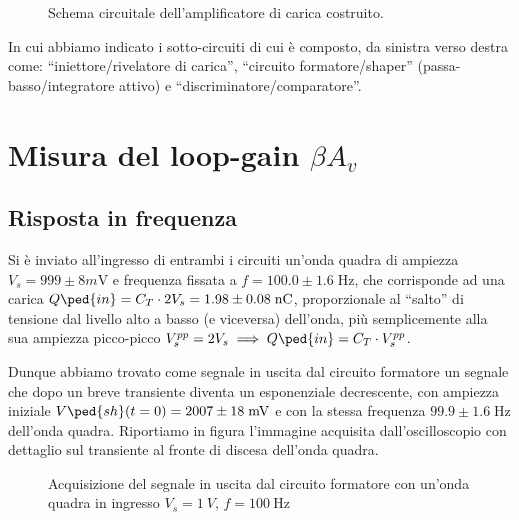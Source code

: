 \documentclass[10pt, a4paper, italian]{article}
\begin{document}
\begin{figure}[htbp]
    \centering
    \caption{Schema circuitale dell'amplificatore di carica costruito.
    \label{fig: Qampschm}}
\end{figure}

In cui abbiamo indicato i sotto-circuiti di cui è composto, da sinistra verso
destra come: ``iniettore/rivelatore di carica'', ``circuito formatore/shaper''
(passa-basso/integratore attivo) e ``discriminatore/comparatore''.

\section{Misura del loop-gain $\beta A_v$}

\subsection{Risposta in frequenza}
Si è inviato all'ingresso di entrambi i circuiti un'onda quadra di
ampiezza $V_s = 999 \pm 8 \si{m\V}$ e frequenza fissata a
$f = 100.0 \pm 1.6 \; \si{\Hz}$, che corrisponde ad una carica
$Q\ped{in} = C_T \cdot 2V_s = 1.98 \pm 0.08 \; \si{n\coulomb}$, proporzionale
al ``salto'' di tensione dal livello alto a basso (e viceversa) dell'onda,
più semplicemente alla sua ampiezza picco-picco
$V_s^{pp} = 2 V_s \implies Q\ped{in} = C_T \cdot V_s^{pp}$.

Dunque abbiamo trovato come segnale in uscita dal circuito formatore un
segnale che dopo un breve transiente diventa un esponenziale decrescente,
con ampiezza iniziale $V\ped{sh} (t=0) = 2007 \pm 18 \; \si{m\V}$ e
con la stessa frequenza $99.9 \pm 1.6 \; \si{\Hz}$ dell'onda quadra.
Riportiamo in figura l'immagine acquisita dall'oscilloscopio con dettaglio
sul transiente al fronte di discesa dell'onda quadra.
\begin{figure}[htbp]
    \centering
    \caption{Acquisizione del segnale in uscita dal circuito formatore con
    un'onda quadra in ingresso $V_s = \SI{1}{V}$, $f = \SI{100}{\Hz}$
    \label{fig: shzoom}}
\end{figure}
\end{document}
